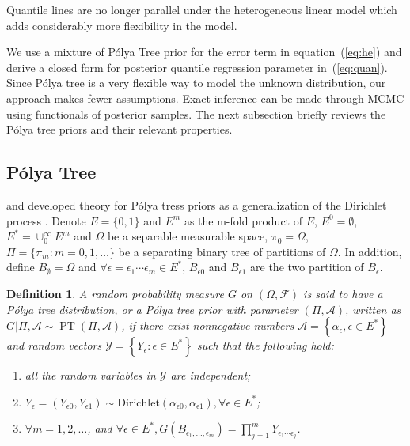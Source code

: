 \documentclass[12pt]{article}
\newtheorem{deff}[thm]{Definition}
\newcommand{\polya}{P\'{o}lya}
\DeclareMathOperator{\pt}{PT}
\begin{document}
Quantile lines are no longer parallel under the heterogeneous linear
model which adds considerably more flexibility in the model.

We use a mixture of \polya{} Tree prior for the error term in equation~(\ref{eq:he})
 and derive a closed form for posterior quantile
regression parameter in~(\ref{eq:quan}).  Since \polya{} tree is a
very flexible way to model the unknown distribution, our approach
makes fewer assumptions.  Exact inference can be made through MCMC using
functionals of posterior samples. The next subsection briefly reviews
the \polya{} tree priors and their relevant properties.

\subsection{\polya{} Tree}
\citet{lavine1992, lavine1994} and \citet{mauldin1992} developed
theory for \polya{} tress priors as a generalization of the Dirichlet
process \citep{ferguson1974}. Denote $E=\{0,1\}$ and $E^m$ as the
m-fold product of $E$, $E^0= \emptyset$, $E^{*} = \cup_0^{\infty} E^m$
and $\Omega$ be a separable measurable space, $\pi_0 = \Omega$, $\Pi=
\{ \pi_m: m=0,1, \ldots \} $ be a separating binary tree of partitions
of $\Omega$. In addition, define $B_{\emptyset} = \Omega$ and $\forall
\epsilon=\epsilon_1\cdots \epsilon_m \in E^{*}$, $B_{\epsilon 0}$ and
$B_{\epsilon 1}$ are the two partition of $B_{\epsilon}$.
\begin{deff}
  A random probability measure $G$ on $(\Omega, \mathcal{F})$ is said
  to have a \polya{} tree distribution, or a \polya{} tree prior with
  parameter $(\Pi, \mathcal{A})$, written as $G|\Pi, \mathcal{A} \sim
  \pt (\Pi, \mathcal{A})$, if there exist nonnegative numbers
  $\mathcal{A}= \left\{ \alpha_{\epsilon}, \epsilon \in E^{*}
  \right\}$ and random vectors $\mathcal{Y} = \left\{ Y_{\epsilon} :
    \epsilon \in E^{*} \right\}$ such that the following hold:
  \begin{enumerate}
  \item\label{item:1} all the random variables in $\mathcal{Y}$ are
    independent;
  \item $Y_{\epsilon}= (Y_{\epsilon 0}, Y_{\epsilon 1}) \sim
    \mathrm{Dirichlet}(\alpha_{\epsilon 0 }, \alpha_{\epsilon 1}),
    \forall \epsilon \in E^{*}$;
  \item $\forall m=1,2, \ldots$, and $\forall \epsilon \in E^{*},
    G(B_{\epsilon_{1}, \ldots, \epsilon_m}) = \prod_{j=1}^m
    Y_{\epsilon_1 \cdots \epsilon_j}$.
  \end{enumerate}
\end{deff}
\end{document}
